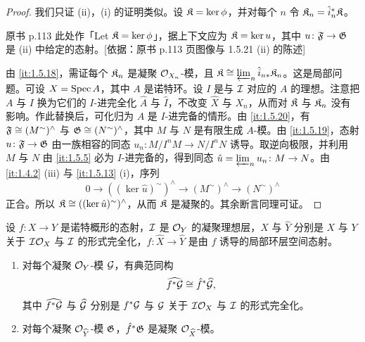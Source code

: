 \begin{proof}
我们只证 (ii)，(i) 的证明类似。设 $\mathfrak{K}=\ker\phi$，并对每个 $n$ 令 $\mathfrak{K}_n=\hat i_n^*\mathfrak{K}$。
\begin{tnote}
原书 p.113 此处作「Let $\mathfrak{K}=\ker\phi$」，据上下文应为 $\mathfrak{K}=\ker u$，其中 $u\colon\mathfrak{F}\to\mathfrak{G}$ 是 (ii) 中给定的态射。[依据：原书 p.113 页图像与 1.5.21 (ii) 的陈述]
\end{tnote}
由 \ref{it:1.5.18}，需证每个 $\mathfrak{K}_n$ 是凝聚 $\mathcal{O}_{X_n}$-模，且 $\mathfrak{K}\cong\varprojlim_n\hat i_{n*}\mathfrak{K}_n$。这是局部问题。可设 $X=\operatorname{Spec} A$，其中 $A$ 是诺特环。设 $I$ 是与 $\mathcal{I}$ 对应的 $A$ 的理想。注意把 $A$ 与 $I$ 换为它们的 $I$-进完全化 $\widehat A$ 与 $\widehat I$，不改变 $\widehat X$ 与 $X_n$，从而对 $\mathfrak{K}$ 与 $\mathfrak{K}_n$ 没有影响。作此替换后，可化归为 $A$ 是 $I$-进完备的情形。由 \ref{it:1.5.20}，有 $\mathfrak{F}\cong(M^{\sim})^{\wedge}$ 与 $\mathfrak{G}\cong(N^{\sim})^{\wedge}$，其中 $M$ 与 $N$ 是有限生成 $A$-模。由 \ref{it:1.5.19}，态射 $u\colon\mathfrak{F}\to\mathfrak{G}$ 由一族相容的同态 $u_n\colon M/I^nM\to N/I^nN$ 诱导。取逆向极限，并利用 $M$ 与 $N$ 由 \ref{it:1.5.5} 必为 $I$-进完备的，得到同态 $\hat u=\varprojlim_n u_n\colon M\to N$。由 \ref{it:1.4.2} (iii) 与 \ref{it:1.5.13} (i)，序列
\[
0\to((\ker\hat u)^{\sim})^{\wedge}\to(M^{\sim})^{\wedge}\to(N^{\sim})^{\wedge}
\]
正合。所以 $\mathfrak{K}\cong((\ker\hat u)^{\sim})^{\wedge}$，从而 $\mathfrak{K}$ 是凝聚的。其余断言同理可证。
\end{proof}

\begin{proposition}\label{it:1.5.22}
设 $f\colon X\to Y$ 是诺特概形的态射，$\mathcal{I}$ 是 $\mathcal{O}_Y$ 的凝聚理想层，$\widehat X$ 与 $\widehat Y$ 分别是 $X$ 与 $Y$ 关于 $\mathcal{I}\mathcal{O}_X$ 与 $\mathcal{I}$ 的形式完全化，$\hat f\colon\widehat X\to\widehat Y$ 是由 $f$ 诱导的局部环层空间态射。
\begin{enumerate}[label=(\roman*),leftmargin=2.8em]
  \item 对每个凝聚 $\mathcal{O}_Y$-模 $\mathcal{G}$，有典范同构
  \[
  \widehat{f^*\mathcal{G}}\cong\hat f^*\widehat{\mathcal{G}},
  \]
  其中 $\widehat{f^*\mathcal{G}}$ 与 $\widehat{\mathcal{G}}$ 分别是 $f^*\mathcal{G}$ 与 $\mathcal{G}$ 关于 $\mathcal{I}\mathcal{O}_X$ 与 $\mathcal{I}$ 的形式完全化。
  \item 对每个凝聚 $\mathcal{O}_{\widehat Y}$-模 $\mathfrak{G}$，$\hat f^*\mathfrak{G}$ 是凝聚 $\mathcal{O}_{\widehat X}$-模。
\end{enumerate}
\end{proposition}

